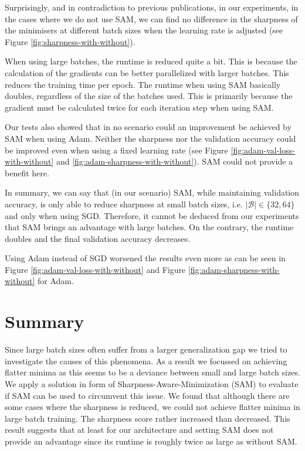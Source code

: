 \documentclass[10pt,conference,compsocconf]{IEEEtran}
\begin{document}
Surprisingly, and in contradiction to previous publications, in our experiments, in the cases where we do not use SAM, we can find no difference in the sharpness of the minimisers at different batch sizes when the learning rate is adjusted (see Figure \ref{fig:sharpness-with-without}).

When using large batches, the runtime is reduced quite a bit. This is because the calculation of the gradients can be better parallelized with larger batches. This reduces the training time per epoch. The runtime when using SAM basically doubles, regardless of the size of the batches used. This is primarily because the gradient must be calculated twice for each iteration step when using SAM.

Our tests also showed that in no scenario could an improvement be achieved by SAM when using Adam. Neither the sharpness nor the validation accuracy could be improved even when using a fixed learning rate (see Figure \ref{fig:adam-val-loss-with-without} and \ref{fig:adam-sharpness-with-without}). SAM could not provide a benefit here.

In summary, we can say that (in our scenario) SAM, while maintaining validation accuracy, is only able to reduce sharpness at small batch sizes, i.e. $|\mathcal{B}| \in \{32, 64\}$ and only when using SGD. Therefore, it cannot be deduced from our experiments that SAM brings an advantage with large batches. On the contrary, the runtime doubles and the final validation accuracy decreases.

Using Adam instead of SGD worsened the results even more as can be seen in Figure \ref{fig:adam-val-loss-with-without} and Figure \ref{fig:adam-sharpness-with-without} for Adam.

\section{Summary}
Since large batch sizes often suffer from a larger generalization gap we tried to investigate the causes of this phenomena. As a result we focussed on achieving flatter minima as this seems to be a deviance between small and large batch sizes. We apply a solution in form of Sharpness-Aware-Minimization (SAM) to evaluate if SAM can be used to circumvent this issue. We found that although there are some cases where the sharpness is reduced, we could not achieve flatter minima in large batch training. The sharpness score rather increased than decreased. This result suggests that at least for our architecture and setting SAM does not provide an advantage since its runtime is roughly twice as large as without SAM.
\end{document}
